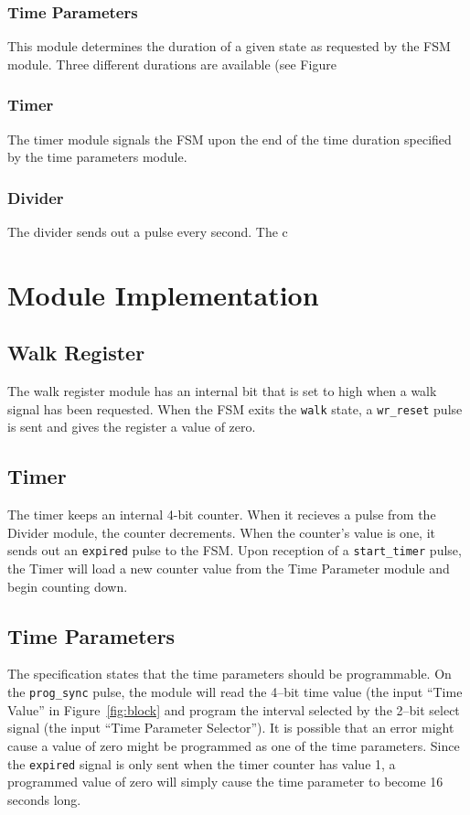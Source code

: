 \documentclass{article}
\begin{document}
		\subsubsection{Time Parameters}
			This module determines the duration of a given state
			as requested by the FSM module.  Three different
			durations are available (see Figure 

		\subsubsection{Timer}
			The timer module signals the FSM upon the end of the
			time duration specified by the time parameters module.

		\subsubsection{Divider}
			The divider sends out a pulse every second.  The c

\section{Module Implementation}
	\subsection{Walk Register}
		The walk register module has an internal bit that is set to
		high when a walk signal has been requested.  When the FSM exits
		the \texttt{walk} state, a \texttt{wr\_reset} pulse is sent and
		gives the register a value of zero.

	\subsection{Timer}
		The timer keeps an internal 4-bit counter.  When it recieves a
		pulse from the Divider module, the counter decrements.  When
		the counter's value is one, it sends out an {\texttt{expired}}
		pulse to the FSM.  Upon reception of a {\texttt{start\_timer}}
		pulse, the Timer will load a new counter value from the Time
		Parameter module and begin counting down.

	\subsection{Time Parameters}
		The specification states that the time parameters should be
		programmable.  On the \texttt{prog\_sync} pulse, the module will
		read the 4--bit time value (the input ``Time Value'' in
		Figure~\ref{fig:block} and program the interval selected by the 2--bit
		select signal (the input ``Time Parameter Selector'').
		It is possible that an error might cause a value of zero might be
		programmed as one of the time parameters.  Since the \texttt{expired}
		signal is only sent when the timer counter has value 1, a programmed
		value of zero will simply cause the time parameter to become 16 seconds
		long.
\end{document}
